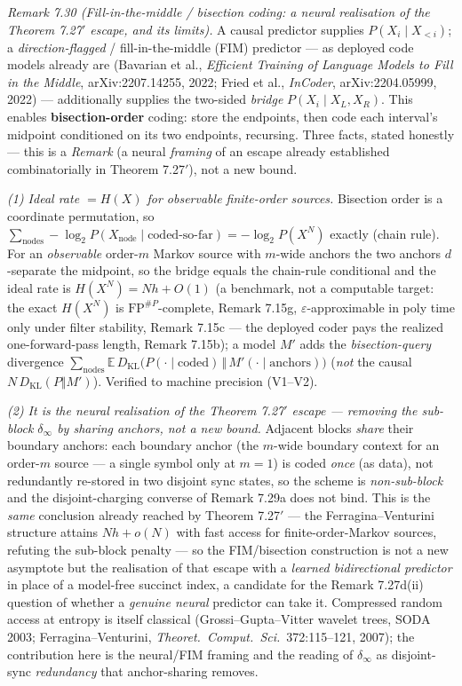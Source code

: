 \documentclass[
]{article}
\begin{document}
\emph{Remark 7.30 (Fill-in-the-middle / bisection coding: a neural realisation of the
Theorem 7.27$'$ escape, and its limits).} A causal predictor supplies $P(X_i\mid X_{<i})$;
a \emph{direction-flagged} / fill-in-the-middle (FIM) predictor --- as deployed code models
already are (Bavarian et al., \emph{Efficient Training of Language Models to Fill in the
Middle}, arXiv:2207.14255, 2022; Fried et al., \emph{InCoder}, arXiv:2204.05999, 2022) ---
additionally supplies the two-sided \emph{bridge} $P(X_i\mid X_L,X_R)$. This enables
\textbf{bisection-order} coding: store the endpoints, then code each interval's midpoint
conditioned on its two endpoints, recursing. Three facts, stated honestly --- this is a
\emph{Remark} (a neural \emph{framing} of an escape already established combinatorially in
Theorem 7.27$'$), not a new bound.

\emph{(1) Ideal rate $=H(X)$ for observable finite-order sources.} Bisection order is a
coordinate permutation, so $\sum_{\text{nodes}}-\log_2 P(X_{\text{node}}\mid
\text{coded-so-far})=-\log_2 P(X^N)$ exactly (chain rule). For an \emph{observable}
order-$m$ Markov source with $m$-wide anchors the two anchors $d$-separate the midpoint, so
the bridge equals the chain-rule conditional and the ideal rate is $H(X^N)=Nh+O(1)$ (a
benchmark, not a computable target: the exact $H(X^N)$ is $\mathrm{FP}^{\#P}$-complete,
Remark 7.15g, $\varepsilon$-approximable in poly time only under filter stability, Remark
7.15c --- the deployed coder pays the realized one-forward-pass length, Remark 7.15b); a
model $M'$ adds the \emph{bisection-query} divergence $\sum_{\text{nodes}}\mathbb E\,
D_{\mathrm{KL}}\!\big(P(\cdot\mid\text{coded})\,\Vert\,M'(\cdot\mid\text{anchors})\big)$
(\emph{not} the causal $N\,D_{\mathrm{KL}}(P\Vert M')$). Verified to machine precision
(V1--V2).

\emph{(2) It is the \emph{neural} realisation of the Theorem 7.27$'$ escape --- removing
the sub-block $\delta_\infty$ by \emph{sharing} anchors, not a new bound.} Adjacent blocks
\emph{share} their boundary anchors: each boundary anchor (the $m$-wide boundary context
for an order-$m$ source --- a single symbol only at $m=1$) is coded \emph{once} (as data),
not redundantly re-stored in two disjoint sync states, so the scheme is
\emph{non-sub-block} and the disjoint-charging converse of Remark 7.29a does not bind. This
is the \emph{same} conclusion already reached by Theorem 7.27$'$ --- the
Ferragina--Venturini structure attains $Nh+o(N)$ with fast access for finite-order-Markov
sources, refuting the sub-block penalty --- so the FIM/bisection construction is not a new
asymptote but the realisation of that escape with a \emph{learned bidirectional predictor}
in place of a model-free succinct index, a candidate for the Remark 7.27d(ii) question of
whether a \emph{genuine neural} predictor can take it. Compressed random access at entropy
is itself classical (Grossi--Gupta--Vitter wavelet trees, SODA 2003; Ferragina--Venturini,
\emph{Theoret.\ Comput.\ Sci.}\ 372:115--121, 2007); the contribution here is the
neural/FIM framing and the reading of $\delta_\infty$ as disjoint-sync \emph{redundancy}
that anchor-sharing removes.
\end{document}
